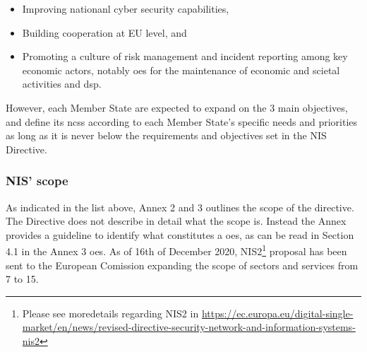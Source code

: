 \begin{itemize}
    \item Improving nationanl cyber security capabilities,
    \item Building cooperation at EU level, and
    \item Promoting a culture of risk management and incident reporting among key economic actors, notably \acrfull{oes} for the maintenance of economic and scietal activities and \acrfull{dsp}.
\end{itemize}

However, each Member State are expected to expand on the 3 main objectives, and define its \acrshort{ncss} according to each Member State's specific needs and priorities as long as it is never below the requirements and objectives set in the NIS Directive.

\subsubsection{NIS' scope}

As indicated in the list above, Annex 2 and 3 outlines the scope of the directive. The Directive does not describe in detail what the scope is. Instead the Annex provides a guideline to identify what constitutes a \acrfull{oes}, as can be read in Section 4.1 in the Annex 3 \acrshort{oes}. As of 16th of December 2020, NIS2\footnote[4]{Please see moredetails regarding NIS2 in \url{https://ec.europa.eu/digital-single-market/en/news/revised-directive-security-network-and-information-systems-nis2}} proposal has been sent to the European Comission expanding the scope of sectors and services from 7 to 15. 

